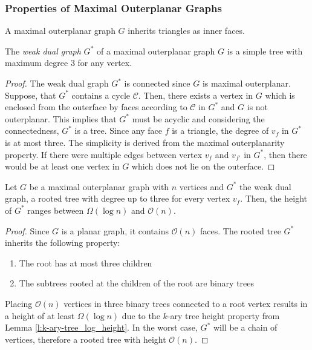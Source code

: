 \subsubsection{Properties of Maximal Outerplanar Graphs}
\begin{lemma}
	A maximal outerplanar graph $G$ inherits triangles as inner faces.
\end{lemma}
\begin{lemma}\label{l:outerplanar-dual-tree-degree-3}
	The \emph{weak dual graph} $G^*$ of a maximal outerplanar graph $G$ is a simple tree with maximum degree 3 for any vertex.
\end{lemma}
\begin{proof}
	The weak dual graph $G^*$ is connected since $G$ is maximal outerplanar. Suppose, that $G^*$ contains a cycle $\mathcal{C}$. Then, there exists a vertex in $G$ which is enclosed from the outerface by faces according to $\mathcal{C}$ in $G^*$ and $G$ is not outerplanar. This implies that $G^*$ must be acyclic and considering the connectedness, $G^*$ is a tree. Since any face $f$ is a triangle, the degree of $v_f$ in $G^*$ is at most three. The simplicity is derived from the maximal outerplanarity property. If there were multiple edges between vertex $v_f$ and $v_{f'}$ in $G^*$, then there would be at least one vertex in $G$ which does not lie on the outerface.
\end{proof}
\begin{lemma}
	Let $G$ be a maximal outerplanar graph with $n$ vertices and $G^*$ the weak dual graph, a rooted tree with degree up to three for every vertex $v_f$. Then, the height of $G^*$ ranges between $\Omega(\log n)$ and $\mathcal{O}(n)$.
\end{lemma}
\begin{proof}
	Since $G$ is a planar graph, it contains $\mathcal{O}(n)$ faces. The rooted tree $G^*$ inherits the following property:
	\begin{enumerate}
		\item The root has at most three children
		\item The subtrees rooted at the children of the root are binary trees
	\end{enumerate}
	Placing $\mathcal{O}(n)$ vertices in three binary trees connected to a root vertex results in a height of at least $\Omega(\log n)$ due to the $k$-ary tree height property from Lemma \ref{l:k-ary-tree_log_height}. In the worst case, $G^*$ will be a chain of vertices, therefore a rooted tree with height $\mathcal{O}(n)$.
\end{proof}

